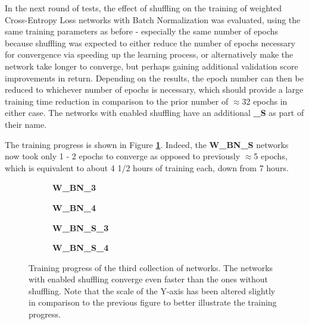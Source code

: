 In the next round of tests, the effect of shuffling on the training of weighted Cross-Entropy Loss networks with Batch Normalization was evaluated, using the same training parameters as before - especially the same number of epochs because shuffling was expected to either reduce the number of epochs necessary for convergence via speeding up the learning process, or alternatively make the network take longer to converge, but perhaps gaining additional validation score improvements in return. Depending on the results, the epoch number can then be reduced to whichever number of epochs is necessary, which should provide a large training time reduction in comparison to the prior number of $\approx$32 epochs in either case. The networks with enabled shuffling have an additional \textbf{\_S} as part of their name.

The training progress is shown in Figure \textbf{\ref{fig:weighted_batchnorm_shuffle_training}}. Indeed, the \textbf{W\_BN\_S} networks now took only 1 - 2 epochs to converge as opposed to previously $\approx$5 epochs, which is equivalent to about 4 1/2 hours of training each, down from 7 hours.


\begin {figure}[!htb]
	\begin {subfigure}[b]{0.4\linewidth}
		\scalebox{0.65}{}
		\caption{\textbf{W\_BN\_3}}
	\end {subfigure}\hspace{1.75cm}
	\begin {subfigure}[b]{0.4\linewidth}
		\scalebox{0.65}{}
		\caption{\textbf{W\_BN\_4}}
	\end {subfigure}

	\begin {subfigure}[b]{0.4\linewidth}
		\scalebox{0.65}{}
		\caption{\textbf{W\_BN\_S\_3}}
	\end {subfigure}\hspace{1.75cm}
	\begin {subfigure}[b]{0.4\linewidth}
		\scalebox{0.65}{}
		\caption{\textbf{W\_BN\_S\_4}}
	\end {subfigure}

		\caption[Training progress of the third collection of networks.]{Training progress of the third collection of networks. The networks with enabled shuffling converge even faster than the ones without shuffling. Note that the scale of the Y-axis has been altered slightly in comparison to the previous figure to better illustrate the training progress.}
		\label{fig:weighted_batchnorm_shuffle_training}
\end {figure}


